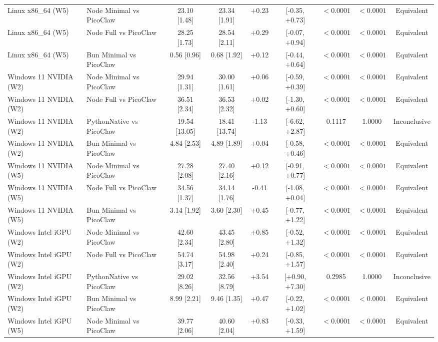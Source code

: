 \begin{table}[t]
{\begin{tabular}{llccccccc}
Linux x86\_64 (W5) & Node Minimal vs PicoClaw & 23.10 [1.48] & 23.34 [1.91] & +0.23 & [-0.35, +0.73] & $< 0.0001$ & $< 0.0001$ & Equivalent \\
Linux x86\_64 (W5) & Node Full vs PicoClaw & 28.25 [1.73] & 28.54 [2.11] & +0.29 & [-0.07, +0.94] & $< 0.0001$ & $< 0.0001$ & Equivalent \\
Linux x86\_64 (W5) & Bun Minimal vs PicoClaw & 0.56 [0.96] & 0.68 [1.92] & +0.12 & [-0.44, +0.64] & $< 0.0001$ & $< 0.0001$ & Equivalent \\
Windows 11 NVIDIA (W2) & Node Minimal vs PicoClaw & 29.94 [1.31] & 30.00 [1.61] & +0.06 & [-0.59, +0.39] & $< 0.0001$ & $< 0.0001$ & Equivalent \\
Windows 11 NVIDIA (W2) & Node Full vs PicoClaw & 36.51 [2.34] & 36.53 [2.32] & +0.02 & [-1.30, +0.60] & $< 0.0001$ & $< 0.0001$ & Equivalent \\
Windows 11 NVIDIA (W2) & PythonNative vs PicoClaw & 19.54 [13.05] & 18.41 [13.74] & -1.13 & [-6.62, +2.87] & 0.1117 & 1.0000 & Inconclusive \\
Windows 11 NVIDIA (W2) & Bun Minimal vs PicoClaw & 4.84 [2.53] & 4.89 [1.89] & +0.04 & [-0.58, +0.46] & $< 0.0001$ & $< 0.0001$ & Equivalent \\
Windows 11 NVIDIA (W5) & Node Minimal vs PicoClaw & 27.28 [2.08] & 27.40 [2.16] & +0.12 & [-0.91, +0.77] & $< 0.0001$ & $< 0.0001$ & Equivalent \\
Windows 11 NVIDIA (W5) & Node Full vs PicoClaw & 34.56 [1.37] & 34.14 [1.76] & -0.41 & [-1.08, +0.04] & $< 0.0001$ & $< 0.0001$ & Equivalent \\
Windows 11 NVIDIA (W5) & Bun Minimal vs PicoClaw & 3.14 [1.92] & 3.60 [2.30] & +0.45 & [-0.77, +1.22] & $< 0.0001$ & $< 0.0001$ & Equivalent \\
Windows Intel iGPU (W2) & Node Minimal vs PicoClaw & 42.60 [2.34] & 43.45 [2.80] & +0.85 & [-0.52, +1.32] & $< 0.0001$ & $< 0.0001$ & Equivalent \\
Windows Intel iGPU (W2) & Node Full vs PicoClaw & 54.74 [3.17] & 54.98 [2.40] & +0.24 & [-0.85, +1.57] & $< 0.0001$ & $< 0.0001$ & Equivalent \\
Windows Intel iGPU (W2) & PythonNative vs PicoClaw & 29.02 [8.26] & 32.56 [8.79] & +3.54 & [+0.90, +7.30] & 0.2985 & 1.0000 & Inconclusive \\
Windows Intel iGPU (W2) & Bun Minimal vs PicoClaw & 8.99 [2.21] & 9.46 [1.35] & +0.47 & [-0.22, +1.02] & $< 0.0001$ & $< 0.0001$ & Equivalent \\
Windows Intel iGPU (W5) & Node Minimal vs PicoClaw & 39.77 [2.06] & 40.60 [2.04] & +0.83 & [-0.33, +1.59] & $< 0.0001$ & $< 0.0001$ & Equivalent \\
\bottomrule
\end{tabular}
}
\end{table}
